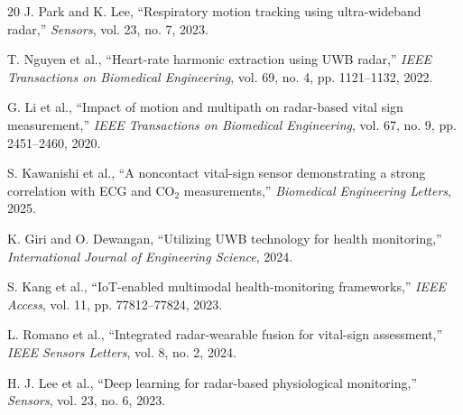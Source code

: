 \documentclass[conference]{IEEEtran}
\begin{document}
\begin{thebibliography}{20}
J. Park and K. Lee, ``Respiratory motion tracking using ultra-wideband radar,'' \textit{Sensors}, vol. 23, no. 7, 2023.

T. Nguyen et al., ``Heart-rate harmonic extraction using UWB radar,'' \textit{IEEE Transactions on Biomedical Engineering}, vol. 69, no. 4, pp. 1121--1132, 2022.

G. Li et al., ``Impact of motion and multipath on radar-based vital sign measurement,'' \textit{IEEE Transactions on Biomedical Engineering}, vol. 67, no. 9, pp. 2451--2460, 2020.

S. Kawanishi et al., ``A noncontact vital-sign sensor demonstrating a strong correlation with ECG and CO$_2$ measurements,'' \textit{Biomedical Engineering Letters}, 2025.

K. Giri and O. Dewangan, ``Utilizing UWB technology for health monitoring,'' \textit{International Journal of Engineering Science}, 2024.

S. Kang et al., ``IoT-enabled multimodal health-monitoring frameworks,'' \textit{IEEE Access}, vol. 11, pp. 77812--77824, 2023.

L. Romano et al., ``Integrated radar-wearable fusion for vital-sign assessment,'' \textit{IEEE Sensors Letters}, vol. 8, no. 2, 2024.

H. J. Lee et al., ``Deep learning for radar-based physiological monitoring,'' \textit{Sensors}, vol. 23, no. 6, 2023.

\end{thebibliography}
\end{document}
